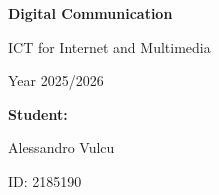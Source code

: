 \begin{titlepage}
    \raggedright
    \vspace*{1cm} %

    {\Huge\bfseries Digital Communication}\par %
    \vspace{0.5cm}
    {\LARGE ICT for Internet and Multimedia}\par %
    \vspace{0.2cm}
    {\large Year 2025/2026}\par %

    \vfill %

    \begin{flushright}
        {\Large \textbf{Student:}}\par
        {\Large Alessandro Vulcu}\par
        {\large ID: 2185190}\par
    \end{flushright}

    \vspace{2cm} %


\end{titlepage}
